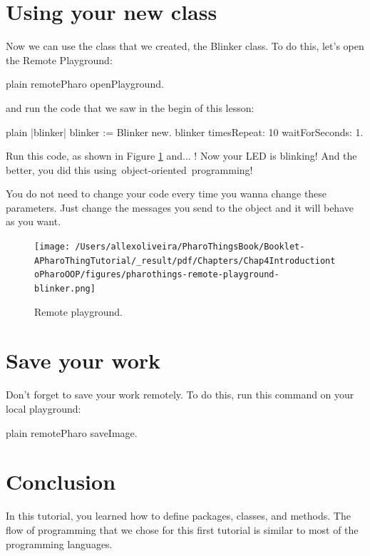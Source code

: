 \documentclass[10pt,twoside,english]{_support/latex/sbabook/sbabook}
\begin{document}
\section{Using your new class}
Now we can use the class that we created, the Blinker class. To do this, let's open the Remote Playground:

\begin{displaycode}{plain}
remotePharo openPlayground.
\end{displaycode}

and run the code that we saw in the begin of this lesson:

\begin{displaycode}{plain}
|blinker|
blinker := Blinker new. 
blinker timesRepeat: 10 waitForSeconds: 1.
\end{displaycode}

Run this code, as shown in Figure \ref{RemotePlayground} and... ! Now your LED is blinking! And the better, you did this using object-oriented programming! 

 You do not need to change your code every time you wanna change these parameters. Just change the messages you send to the object and it will behave as you want.


\begin{figure}

\begin{center}
\texttt{[image: /Users/allexoliveira/PharoThingsBook/Booklet-APharoThingTutorial/\_result/pdf/Chapters/Chap4IntroductiontoPharoOOP/figures/pharothings-remote-playground-blinker.png]}\caption{Remote playground.\label{RemotePlayground}}\end{center}
\end{figure}



\section{Save your work}
Don't forget to save your work remotely. To do this, run this command on your local playground:

\begin{displaycode}{plain}
remotePharo saveImage.
\end{displaycode}
\section{Conclusion}
In this tutorial, you learned how to define packages, classes, and methods. The flow of programming that we chose for this first tutorial is similar to most of the programming languages.
\end{document}
